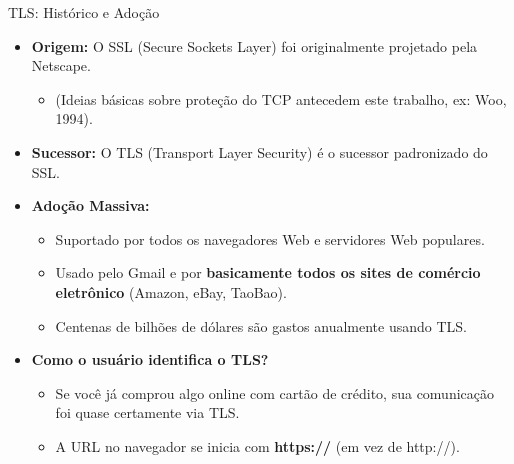 \begin{frame}{TLS: Histórico e Adoção}
    \begin{itemize}
        \item \textbf{Origem:} O SSL (Secure Sockets Layer) foi originalmente projetado pela Netscape.
              \begin{itemize}
                  \item (Ideias básicas sobre proteção do TCP antecedem este trabalho, ex: Woo, 1994).
              \end{itemize}

        \item \textbf{Sucessor:} O TLS (Transport Layer Security) é o sucessor padronizado do SSL.

        \item \textbf{Adoção Massiva:}
              \begin{itemize}
                  \item Suportado por todos os navegadores Web e servidores Web populares.
                  \item Usado pelo Gmail e por \textbf{basicamente todos os sites de comércio eletrônico} (Amazon, eBay, TaoBao).
                  \item Centenas de bilhões de dólares são gastos anualmente usando TLS.
              \end{itemize}

        \item \textbf{Como o usuário identifica o TLS?}
              \begin{itemize}
                  \item Se você já comprou algo online com cartão de crédito, sua comunicação foi quase certamente via TLS.
                  \item A URL no navegador se inicia com \textbf{https://} (em vez de http://).
              \end{itemize}
    \end{itemize}
\end{frame}

